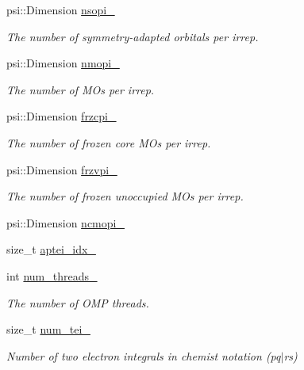 \begin{DoxyCompactItemize}
psi\+::\+Dimension \mbox{\hyperlink{classforte_1_1_forte_integrals_a4265ec277dd2ba9c84baa00b873ef2ca}{nsopi\+\_\+}}
\begin{DoxyCompactList}\small\item\em The number of symmetry-\/adapted orbitals per irrep. \end{DoxyCompactList}\item 
psi\+::\+Dimension \mbox{\hyperlink{classforte_1_1_forte_integrals_a42ea9a1d7fac58f4b6f7aacec22c0fe2}{nmopi\+\_\+}}
\begin{DoxyCompactList}\small\item\em The number of M\+Os per irrep. \end{DoxyCompactList}\item 
psi\+::\+Dimension \mbox{\hyperlink{classforte_1_1_forte_integrals_a6dda8a446b4f3d37a80a7d747298001f}{frzcpi\+\_\+}}
\begin{DoxyCompactList}\small\item\em The number of frozen core M\+Os per irrep. \end{DoxyCompactList}\item 
psi\+::\+Dimension \mbox{\hyperlink{classforte_1_1_forte_integrals_a7489dd8131b0d5e40ca092a01afeac3d}{frzvpi\+\_\+}}
\begin{DoxyCompactList}\small\item\em The number of frozen unoccupied M\+Os per irrep. \end{DoxyCompactList}\item 
psi\+::\+Dimension \mbox{\hyperlink{classforte_1_1_forte_integrals_a89d80b31901b09b1cdc8e7b1735ac53d}{ncmopi\+\_\+}}
\item 
size\+\_\+t \mbox{\hyperlink{classforte_1_1_forte_integrals_a8ec100fdb106f4b2abe8cacb18ef24cc}{aptei\+\_\+idx\+\_\+}}
\item 
int \mbox{\hyperlink{classforte_1_1_forte_integrals_a5a4b02c8be48f24a28416e40ad582590}{num\+\_\+threads\+\_\+}}
\begin{DoxyCompactList}\small\item\em The number of O\+MP threads. \end{DoxyCompactList}\item 
size\+\_\+t \mbox{\hyperlink{classforte_1_1_forte_integrals_a71b35a2e3ec4920ebdd9c77563e740c0}{num\+\_\+tei\+\_\+}}
\begin{DoxyCompactList}\small\item\em Number of two electron integrals in chemist notation (pq$\vert$rs) \end{DoxyCompactList}\item 

\end{DoxyCompactItemize}
